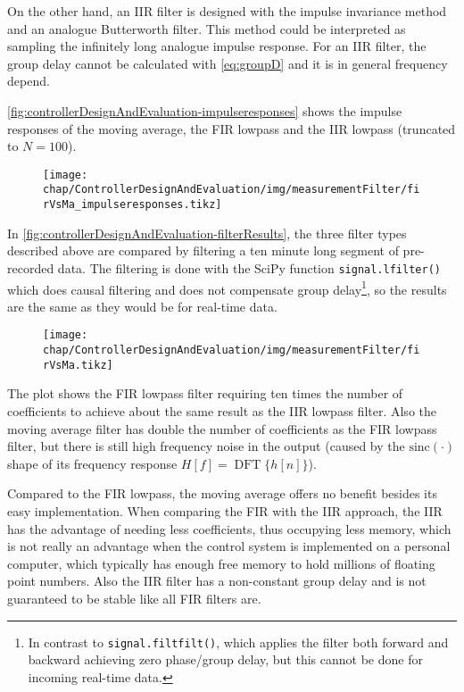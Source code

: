 On the other hand, an IIR filter is designed with the impulse invariance method and an analogue Butterworth filter.
This method could be interpreted as sampling the infinitely long analogue impulse response.\cite[p.~497]{Oppenheim2010}
For an IIR filter, the group delay cannot be calculated with \autoref{eq:groupD} and it is in general frequency depend.

\autoref{fig:controllerDesignAndEvaluation-impulseresponses} shows the impulse responses of the moving average, the FIR lowpass and the IIR lowpass (truncated to $N=100$).

\begin{figure}[tb]
	\centering
	\texttt{[image: chap/ControllerDesignAndEvaluation/img/measurementFilter/firVsMa\_impulseresponses.tikz]}
	\caption{}
	\label{fig:controllerDesignAndEvaluation-impulseresponses}
\end{figure}

In \autoref{fig:controllerDesignAndEvaluation-filterResults}, the three filter types described above are compared by filtering a ten minute long segment of pre-recorded data. The filtering is done with the SciPy function \texttt{signal.lfilter()} which does causal filtering and does not compensate group delay\footnote{In contrast to \texttt{signal.filtfilt()}, which applies the filter both forward and backward achieving zero phase/group delay, but this cannot be done for incoming real-time data.}, so the results are the same as they would be for real-time data.

\begin{figure}[tb]
	\centering
	\texttt{[image: chap/ControllerDesignAndEvaluation/img/measurementFilter/firVsMa.tikz]}
	\caption{}
	\label{fig:controllerDesignAndEvaluation-filterResults}
\end{figure}

The plot shows the FIR lowpass filter requiring ten times the number of coefficients to achieve about the same result as the IIR lowpass filter.
Also the moving average filter has double the number of coefficients as the FIR lowpass filter, but there is still high frequency noise in the output (caused by the $\text{sinc}(\cdot)$ shape of its frequency response $H[f]=\operatorname{DFT}\{h[n]\}$).

Compared to the FIR lowpass, the moving average offers no benefit besides its easy implementation.
When comparing the FIR with the IIR approach, the IIR has the advantage of needing less coefficients, thus occupying less memory, which is not really an advantage when the control system is implemented on a personal computer, which typically has enough free memory to hold millions of floating point numbers.
Also the IIR filter has a non-constant group delay and is not guaranteed to be stable like all FIR filters are.

